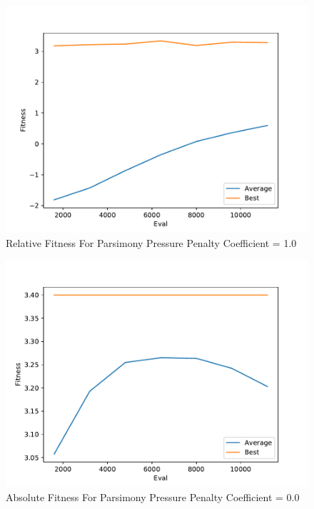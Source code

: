 \documentclass[times]{article}
\begin{document}
	\begin{figure}
		\caption{Relative Fitness For Parsimony Pressure Penalty Coefficient = 1.0}
		\label{fig:relative_plot_2}
		\includegraphics[width=\textwidth]{../graph/graphs/2.pdf}
	\end{figure}



	\begin{figure}
		\caption{Absolute Fitness For Parsimony Pressure Penalty Coefficient = 0.0}
		\label{fig:absolute_plot_0}
		\includegraphics[width=\textwidth]{../graph/absolute/0.pdf}
	\end{figure}
\end{document}

